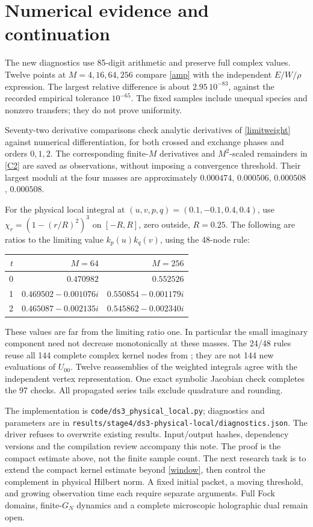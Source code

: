 \documentclass[11pt,a4paper]{article}
\begin{document}
\newpage
\section{Numerical evidence and continuation}
The new diagnostics use 85-digit arithmetic and preserve full complex
values. Twelve points at $M=4,16,64,256$ compare \eqref{amp} with the
independent $E/W/\rho$ expression. The largest relative difference is
about $2.95\,10^{-83}$, against the recorded empirical tolerance
$10^{-65}$. The fixed samples include unequal species and nonzero
transfers; they do not prove uniformity.

Seventy-two derivative comparisons check analytic derivatives of
\eqref{limitweight} against numerical differentiation, for both crossed
and exchange phases and orders $0,1,2$. The corresponding finite-$M$
derivatives and $M^2$-scaled remainders in \eqref{C2} are saved as
observations, without imposing a convergence threshold. Their largest
moduli at the four masses are approximately
$0.000474$, $0.000506$, $0.000508$, $0.000508$.

For the physical local integral at $(u,v,p,q)=(0.1,-0.1,0.4,0.4)$,
use $\chi_r=(1-(r/R)^2)^3$ on $[-R,R]$, zero outside, $R=0.25$.
The following are ratios to the limiting value $k_p(u)k_q(v)$, using
the 48-node rule:
\begin{center}
\begin{tabular}{rrr}
\toprule
$t$ & $M=64$ & $M=256$\\
\midrule
0 & $0.470982$ & $0.552526$\\
1 & $0.469502-0.001076i$ & $0.550854-0.001179i$\\
2 & $0.465087-0.002135i$ & $0.545862-0.002340i$\\
\bottomrule
\end{tabular}
\end{center}
These values are far from the limiting ratio one. In particular the
small imaginary component need not decrease monotonically at these
masses. The 24/48 rules reuse all 144 complete complex kernel nodes
from \cite{local}; they are not 144 new evaluations of $U_{00}$.
Twelve reassemblies of the weighted integrals agree with the independent
vertex representation. One exact symbolic Jacobian check completes the
97 checks. All propagated series tails exclude quadrature and rounding.

The implementation is \texttt{code/ds3\_physical\_local.py}; diagnostics
and parameters are in
\texttt{results/stage4/ds3-physical-local/diagnostics.json}.
The driver refuses to overwrite existing results. Input/output hashes,
dependency versions and the compilation review accompany this note.
The proof is the compact estimate above, not the finite sample count.
The next research task is to extend the compact kernel estimate beyond
\eqref{window}, then control the complement in physical Hilbert norm.
A fixed initial packet, a moving threshold, and growing observation
time each require separate arguments. Full Fock domains, finite-$G_N$
dynamics and a complete microscopic holographic dual remain open.
\end{document}
